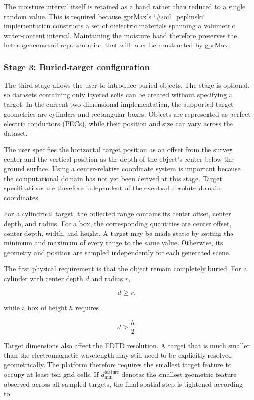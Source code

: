 \documentclass[journal]{IEEEtran}
\begin{document}
The moisture interval itself is retained as a band rather than reduced to a single random value. This is required because gprMax's `\#soil\_peplinski` implementation constructs a set of dielectric materials spanning a volumetric water-content interval. Maintaining the moisture band therefore preserves the heterogeneous soil representation that will later be constructed by gprMax.

\subsubsection{Stage 3: Buried-target configuration}

The third stage allows the user to introduce buried objects. The stage is optional, so datasets containing only layered soils can be created without specifying a target. In the current two-dimensional implementation, the supported target geometries are cylinders and rectangular boxes. Objects are represented as perfect electric conductors (PECs), while their position and size can vary across the dataset.

The user specifies the horizontal target position as an offset from the survey center and the vertical position as the depth of the object's center below the ground surface. Using a center-relative coordinate system is important because the computational domain has not yet been derived at this stage. Target specifications are therefore independent of the eventual absolute domain coordinates.

For a cylindrical target, the collected range contains its center offset, center depth, and radius. For a box, the corresponding quantities are center offset, center depth, width, and height. A target may be made static by setting the minimum and maximum of every range to the same value. Otherwise, its geometry and position are sampled independently for each generated scene.

The first physical requirement is that the object remain completely buried. For a cylinder with center depth \(d\) and radius \(r\),

$$
d \geq r,
$$

while a box of height \(h\) requires

$$
d \geq \frac{h}{2}.
$$

Target dimensions also affect the FDTD resolution. A target that is much smaller than the electromagnetic wavelength may still need to be explicitly resolved geometrically. The platform therefore requires the smallest target feature to occupy at least ten grid cells. If \(d_{\min}^{\mathrm{feature}}\) denotes the smallest geometric feature observed across all sampled targets, the final spatial step is tightened according to
\end{document}
